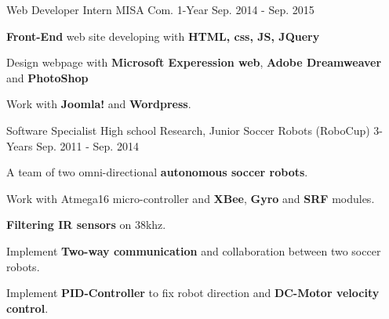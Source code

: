 \begin{cventries}
  \cventry
    {Web Developer Intern} %
    {MISA Com.} %
    {1-Year} %
    {Sep. 2014 - Sep. 2015} %
    {
      \begin{cvitems} %
        \item {\textbf{Front-End} web site developing with \textbf{HTML, css, JS, JQuery}}
        \item {Design webpage with \textbf{Microsoft Experession web}, \textbf{Adobe Dreamweaver} and \textbf{PhotoShop}}
        \item {Work with \textbf{Joomla!} and \textbf{Wordpress}.}
      \end{cvitems}
    }
  \cventry
    {Software Specialist} %
    {High school Research, Junior Soccer Robots (RoboCup)} %
    {3-Years} %
    {Sep. 2011 - Sep. 2014} %
    {
      \begin{cvitems} %
        \item {A team of two omni-directional \textbf{autonomous soccer robots}.}
        \item {Work with Atmega16 micro-controller and \textbf{XBee}, \textbf{Gyro} and \textbf{SRF} modules.}
        \item {\textbf{Filtering IR sensors} on 38khz.}
        \item {Implement \textbf{Two-way communication} and collaboration between two soccer robots.}
        \item {Implement \textbf{PID-Controller} to fix robot direction and \textbf{DC-Motor velocity control}.}
      \end{cvitems}
    }


\end{cventries}
